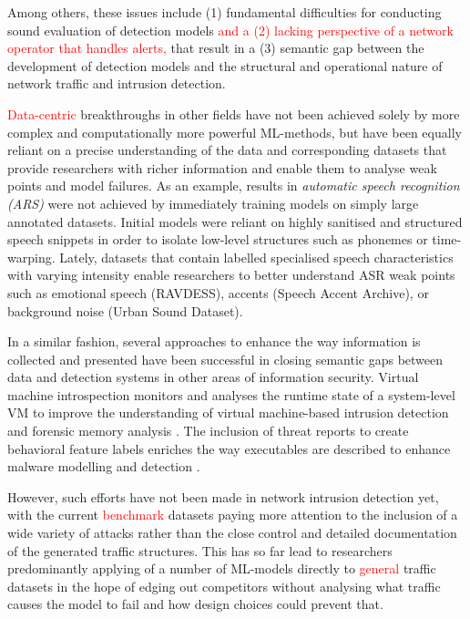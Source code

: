 \documentclass{article}
\begin{document}
Among others, these issues include (1) fundamental difficulties for conducting sound evaluation of detection models \textcolor{red}{and a (2) lacking perspective of a network operator that handles alerts,} that result in a (3) semantic gap between the development of detection models and the structural and operational nature of network traffic and intrusion detection. 

\textcolor{red}{Data-centric} breakthroughs in other fields have not been achieved solely by more complex and computationally more powerful ML-methods, but have been equally reliant on a precise understanding of the data and corresponding datasets that provide researchers with richer information and enable them to analyse weak points and model failures. As an example, results in \textit{automatic speech recognition (ARS)} were not achieved by immediately training models on simply large annotated datasets. Initial models were reliant on highly sanitised and structured speech snippets in order to isolate low-level structures such as phonemes or time-warping. Lately, datasets that contain labelled specialised speech characteristics with varying intensity enable researchers to better understand ASR weak points such as emotional speech (RAVDESS), accents (Speech Accent Archive), or background noise (Urban Sound Dataset).



In a similar fashion, several approaches to enhance the way information is collected and presented have been successful in closing semantic gaps between data and detection systems in other areas of information security. Virtual machine introspection monitors and analyses the runtime state of a system-level VM to improve the understanding of virtual machine-based intrusion detection and forensic memory analysis \cite{dolan2011virtuoso}. The inclusion of threat reports to create behavioral feature labels enriches the way executables are described to enhance malware modelling and detection \cite{smith2020mind}.

However, such efforts have not been made in network intrusion detection yet, with the current \textcolor{red}{benchmark} datasets paying more attention to the inclusion of a wide variety of attacks rather than the close control and detailed documentation of the generated traffic structures. This has so far lead to researchers predominantly applying of a number of ML-models directly to \textcolor{red}{general} traffic datasets in the hope of edging out competitors without analysing what traffic causes the model to fail and how design choices could prevent that.
\end{document}

